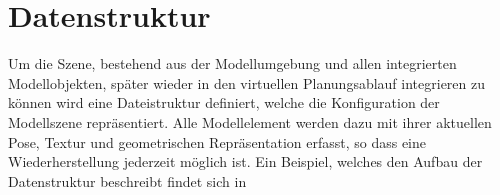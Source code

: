 
\section{Datenstruktur}
Um die Szene, bestehend aus der Modellumgebung und allen integrierten Modellobjekten, später wieder in den virtuellen Planungsablauf integrieren zu können wird eine Dateistruktur definiert, welche die Konfiguration der Modellszene repräsentiert. Alle Modellelement werden dazu mit ihrer aktuellen Pose, Textur und geometrischen Repräsentation erfasst, so dass eine Wiederherstellung jederzeit möglich ist. Ein Beispiel, welches den Aufbau der Datenstruktur beschreibt findet sich in \\